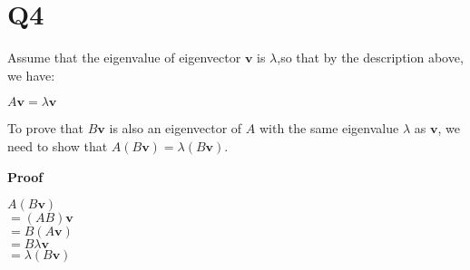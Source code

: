 \documentclass[12pt]{article}
\begin{document}
\section{Q4}
	Assume that the eigenvalue of eigenvector $\textbf{v}$ is $\lambda$,so that by the description above, we have:
	\begin{center}
		$A \textbf{v} = \lambda \textbf{v}$
	\end{center}
	To prove that \(B\mathbf{v}\) is also an eigenvector of \(A\) with the same eigenvalue \(\lambda\) as \(\mathbf{v}\), we need to show that \(A(B\mathbf{v}) = \lambda (B\mathbf{v})\).

	\textbf{Proof}
	\begin{center}
		$A(B\textbf{v})$\\
		$=(AB)\textbf{v}$\\
		$=B(A\textbf{v})$\\
		$=B\lambda \textbf{v}$\\
		$= \lambda (B\textbf{v})$
	\end{center}
\end{document}
